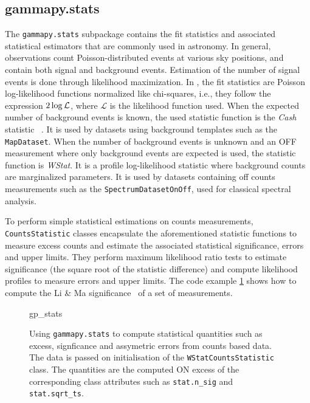 \documentclass[traditabstract, longauth]{aa}
\newcommand{\code}[1]{\texttt{#1}}
\begin{document}
\subsection{gammapy.stats}
\label{ssec:gammapy-stats}
The \code{gammapy.stats} subpackage contains the fit statistics and associated
statistical estimators that are commonly used in \gammaray astronomy. In
general, \gammaray observations count Poisson-distributed events at various sky
positions, and contain both signal and background events. Estimation of the
number of signal events is done through likelihood maximization. In \gammapy,
the fit statistics are Poisson log-likelihood functions normalized like
chi-squares, i.e., they follow the expression $2 \time\cdot \log{\mathcal{L}}$,
where $\mathcal{L}$ is
the likelihood function used. When the expected number of background events is known, the used statistic function 
 is the \emph{Cash} statistic
~\citep{Cash}. It is used by datasets using background templates such as the
\code{MapDataset}. When the number of background events is unknown and an OFF
measurement where only background events are expected is used, the statistic
function is \emph{WStat}. It is a profile log-likelihood statistic where background
counts are marginalized parameters. It is used by datasets containing off
counts measurements such as the \code{SpectrumDatasetOnOff}, used for classical
spectral analysis.

To perform simple statistical estimations on counts measurements,
\code{CountsStatistic} classes encapsulate the aforementioned statistic functions to
measure excess counts and estimate the associated statistical significance,
errors and upper limits. They perform maximum likelihood ratio tests to
estimate significance (the square root of the statistic difference) and compute
likelihood profiles to measure errors and upper limits. The code example
\ref{codeexample:stats} shows how to compute the Li \& Ma
significance~\citep{LiMa} of a set of measurements.

\begin{figure}
	{gp_stats}
	\caption{
        Using \code{gammapy.stats} to compute statistical quantities
        such as excess, signficance and assymetric errors
        from counts based data. The data is passed on initialisation
        of the \code{WStatCountsStatistic} class. The quantities
        are the computed ON excess of the corresponding class
        attributes such as \code{stat.n\_sig} and \code{stat.sqrt\_ts}.
    }
	\label{codeexample:stats} \end{figure}
\end{document}
